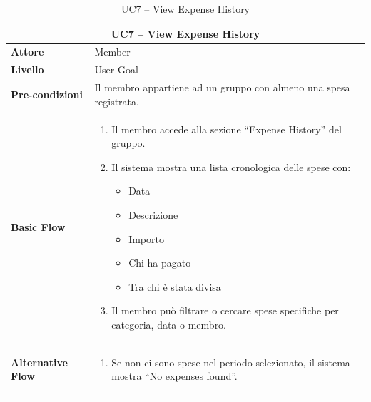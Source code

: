 \begin{table}[htbp]
    \centering
    \footnotesize
    \begin{tabularx}{\textwidth}{|l|X|}
        \hline
        \multicolumn{2}{|c|}{\textbf{UC7 -- View Expense History}} \\
        \hline
        \textbf{Attore} & Member \\
        \hline
        \textbf{Livello} & User Goal \\
        \hline
        \textbf{Pre-condizioni} & Il membro appartiene ad un gruppo con almeno una spesa registrata. \\
        \hline
        \textbf{Basic Flow} & 
        \begin{enumerate}[leftmargin=*, nosep, topsep=3pt]
            \item Il membro accede alla sezione ``Expense History'' del gruppo.
            \item Il sistema mostra una lista cronologica delle spese con:
            \begin{itemize}[nosep, label={--}, topsep=2pt]
                \item Data
                \item Descrizione
                \item Importo
                \item Chi ha pagato
                \item Tra chi è stata divisa
            \end{itemize}
            \item Il membro può filtrare o cercare spese specifiche per categoria, data o membro.
        \end{enumerate} \\
        \hline
        \textbf{Alternative Flow} & 
        \begin{enumerate}[label=2\alph*., leftmargin=*, nosep, topsep=3pt]
            \item Se non ci sono spese nel periodo selezionato, il sistema mostra ``No expenses found''.
        \end{enumerate} \\
        \hline
    \end{tabularx}
    \caption{UC7 -- View Expense History}
    \label{tab:uc7}
\end{table}

